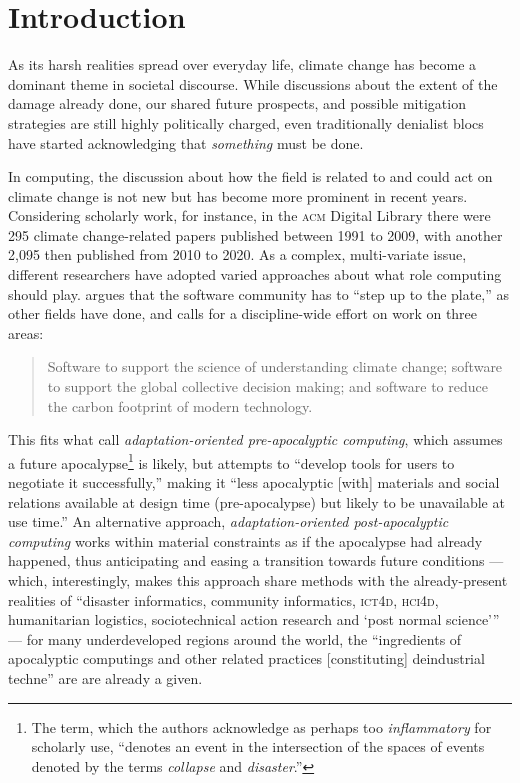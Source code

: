 \section{Introduction}

As its harsh realities spread %
over everyday life, climate change has become a dominant theme in societal discourse. While discussions about the extent of the damage already done, our shared future prospects, and possible mitigation strategies are still highly politically charged, even traditionally denialist blocs have started acknowledging that \emph{something} must be done. \cite{teirstein_2021} 

In computing, the discussion about how the field is related to and could act on climate change is not new but has become more prominent in recent years. Considering scholarly work, for instance, in the \textsc{acm} Digital Library there were 295 climate change-related papers published between 1991 to 2009, with another 2,095 then published from 2010 to 2020. \cite{ferreiraClimateChangeCommunication2021} As a complex, multi-variate issue, different researchers have adopted varied approaches about what role computing should play. \citet{easterbrook2010climate} argues that the software community has to ``step up to the plate,'' as other fields have done, and calls for a discipline-wide effort on work on three areas: 
    \begin{quote}
        Software to support the science of understanding climate change; software to support the global collective decision making; and software to reduce the carbon footprint of modern technology.
    \end{quote}

This fits what \citet{silberman2010precarious} call \emph{adaptation-oriented pre-apocalyptic computing}, which assumes a future apocalypse\footnote{The term, which the authors acknowledge as perhaps too \emph{inflammatory} for scholarly use, ``denotes an event in the intersection of the spaces of events denoted by the terms \emph{collapse} and \emph{disaster}.''} is likely, but attempts to ``develop tools for users to negotiate it successfully,'' making it ``less apocalyptic [with] materials and social relations available at design time (pre-apocalypse) but likely to be unavailable at use time.'' An alternative approach, \emph{adaptation-oriented post-apocalyptic computing} works within material constraints as if the apocalypse had already happened, thus anticipating and easing a transition towards future conditions --- which, interestingly, makes this approach share methods with the already-present realities of ``disaster informatics, community informatics, \textsc{ict4d}, \textsc{hci4d}, humanitarian logistics, sociotechnical action research and `post normal science''' --- for many underdeveloped regions around the world, the ``ingredients of apocalyptic computings and other related practices [constituting] deindustrial techne'' are are already a given.


